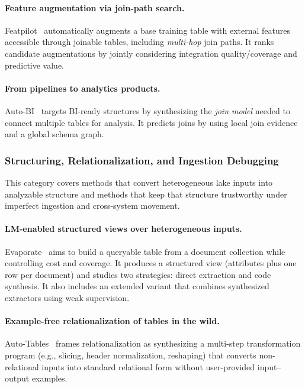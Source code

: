 \documentclass[sigconf,nonacm]{acmart}
\begin{document}
\paragraph{Feature augmentation via join-path search.}
Featpilot~\cite{11113027} automatically augments a base training table with external features accessible through joinable tables, including \emph{multi-hop} join paths. It ranks candidate augmentations by jointly considering integration quality/coverage and predictive value.

\paragraph{From pipelines to analytics products.}
Auto-BI~\cite{10.14778/3603581.3603596} targets BI-ready structures by synthesizing the \emph{join model} needed to connect multiple tables for analysis. It predicts joins by using local join evidence and a global schema graph.



\subsubsection{Structuring, Relationalization, and Ingestion Debugging}
This category covers methods that convert heterogeneous lake inputs into analyzable structure and methods that keep that
structure trustworthy under imperfect ingestion and cross-system movement.

\paragraph{LM-enabled structured views over heterogeneous inputs.}
Evaporate~\cite{10.14778/3626292.3626294} aims to build a queryable table from a document collection while controlling cost and coverage. It produces a structured view (attributes plus one row per document) and studies two strategies: direct extraction and code synthesis. It also includes an extended variant that combines synthesized extractors using weak supervision.

\paragraph{Example-free relationalization of tables in the wild.}
Auto-Tables~\cite{10.1145/3665252.3665269} frames relationalization as synthesizing a multi-step transformation program (e.g., slicing, header normalization, reshaping) that converts non-relational inputs into standard relational form without user-provided input--output examples.
\end{document}
